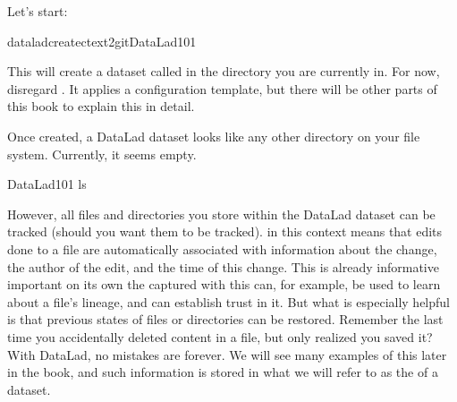 \sphinxAtStartPar
Let’s start:

\ignorespaces 
\def\sphinxLiteralBlockLabel{\label{\detokenize{basics/101-101-create:index-2}}}
\begin{sphinxVerbatim}[commandchars=\\\{\}]
dataladcreate\PYGZhy{}ctext2gitDataLad\PYGZhy{}101
\end{sphinxVerbatim}

\sphinxAtStartPar
This will create a dataset called  in the directory you are currently
in. For now, disregard . It applies a configuration template, but there
will be other parts of this book to explain this in detail.

\sphinxAtStartPar
Once created, a DataLad dataset looks like any other directory on your file system.
Currently, it seems empty.

\begin{sphinxVerbatim}[commandchars=\\\{\}]
DataLad\PYGZhy{}101
ls
\end{sphinxVerbatim}

\sphinxAtStartPar
However, all files and directories you store within the DataLad dataset
can be tracked (should you want them to be tracked).
 in this context means that edits done to a file are automatically
associated with information about the change, the author of the edit,
and the time of this change. This is already informative important on its own
\textendash{} the {\hyperref[\detokenize{glossary:term-provenance}]{}} captured with this can, for example, be used to learn
about a file’s lineage, and can establish trust in it.
But what is especially helpful is that previous states of files or directories
can be restored. Remember the last time you accidentally deleted content
in a file, but only realized  you saved it? With DataLad, no
mistakes are forever. We will see many examples of this later in the book,
and such information is stored in what we will refer
to as the  of a dataset.

